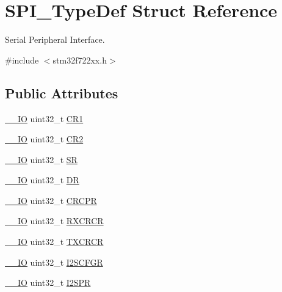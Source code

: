 \hypertarget{struct_s_p_i___type_def}{}\section{S\+P\+I\+\_\+\+Type\+Def Struct Reference}
\label{struct_s_p_i___type_def}


Serial Peripheral Interface.  




{\ttfamily \#include $<$stm32f722xx.\+h$>$}

\subsection*{Public Attributes}
\begin{DoxyCompactItemize}
\item 
\mbox{\hyperlink{core__sc300_8h_aec43007d9998a0a0e01faede4133d6be}{\+\_\+\+\_\+\+IO}} uint32\+\_\+t \mbox{\hyperlink{struct_s_p_i___type_def_a6ecd5cb63b85c381bd67dc90dd4f573a}{C\+R1}}
\item 
\mbox{\hyperlink{core__sc300_8h_aec43007d9998a0a0e01faede4133d6be}{\+\_\+\+\_\+\+IO}} uint32\+\_\+t \mbox{\hyperlink{struct_s_p_i___type_def_a38cb89a872e456e6ecd29b6c71d85600}{C\+R2}}
\item 
\mbox{\hyperlink{core__sc300_8h_aec43007d9998a0a0e01faede4133d6be}{\+\_\+\+\_\+\+IO}} uint32\+\_\+t \mbox{\hyperlink{struct_s_p_i___type_def_a33f3dd6a505d06fe6c466b63be451891}{SR}}
\item 
\mbox{\hyperlink{core__sc300_8h_aec43007d9998a0a0e01faede4133d6be}{\+\_\+\+\_\+\+IO}} uint32\+\_\+t \mbox{\hyperlink{struct_s_p_i___type_def_a02ef206dd5bb270e1f17fedd71284422}{DR}}
\item 
\mbox{\hyperlink{core__sc300_8h_aec43007d9998a0a0e01faede4133d6be}{\+\_\+\+\_\+\+IO}} uint32\+\_\+t \mbox{\hyperlink{struct_s_p_i___type_def_a609d2a279b1927846a991deb9d0dc0b0}{C\+R\+C\+PR}}
\item 
\mbox{\hyperlink{core__sc300_8h_aec43007d9998a0a0e01faede4133d6be}{\+\_\+\+\_\+\+IO}} uint32\+\_\+t \mbox{\hyperlink{struct_s_p_i___type_def_a60f1f0e77c52e89cfd738999bee5c9d0}{R\+X\+C\+R\+CR}}
\item 
\mbox{\hyperlink{core__sc300_8h_aec43007d9998a0a0e01faede4133d6be}{\+\_\+\+\_\+\+IO}} uint32\+\_\+t \mbox{\hyperlink{struct_s_p_i___type_def_a0b5a7f6383eb478bbcc22a36c5e95ae6}{T\+X\+C\+R\+CR}}
\item 
\mbox{\hyperlink{core__sc300_8h_aec43007d9998a0a0e01faede4133d6be}{\+\_\+\+\_\+\+IO}} uint32\+\_\+t \mbox{\hyperlink{struct_s_p_i___type_def_a4a1547c0ed26f31108910c35d2876b83}{I2\+S\+C\+F\+GR}}
\item 
\mbox{\hyperlink{core__sc300_8h_aec43007d9998a0a0e01faede4133d6be}{\+\_\+\+\_\+\+IO}} uint32\+\_\+t \mbox{\hyperlink{struct_s_p_i___type_def_aff2f386a2566c722f7962377b495f1a2}{I2\+S\+PR}}
\end{DoxyCompactItemize}



